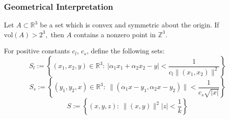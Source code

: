 \documentclass[aspectratio=1610]{beamer}
\begin{document}
\begin{frame}
    \frametitle{Geometrical Interpretation}
    \begin{theorem}
        Let $A \subset \mathbb{R}^3$ be a set which is convex and symmetric about the origin. If 
        $\mathrm{vol}(A)>2^3,$ then $A$ contains a nonzero point in $\mathbb{Z}^3$.
    \end{theorem}
    \vspace{0.5cm}
    For positive constants $c_l$, $c_s$, define the following sets:
    \[
        S_l := \left\{(x_1,x_2, y)\in \mathbb{R}^3:\ |\alpha_1x_1 + \alpha_2x_2-y| < \frac{1}{c_l\|(x_1,x_2)\|^2}\right\}
    \]
    \pause
    \[
        S_s := \left\{(y_1, y_2, x)\in \mathbb{R}^3: \ \|(\alpha_1x - y_1, \alpha_2x-y_2)\| < \frac{1}{c_s\sqrt{|x|}}\right\}
    \]
    \[
        S := \left\{(x, y, z):\ \|(x,y)\|^2|z|<\frac{1}{k}\right\}
    \]
    \\
\end{frame}
\end{document}
